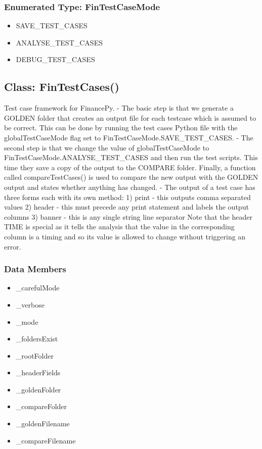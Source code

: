 \documentclass[twoside,11pt]{book}
\begin{document}
\subsubsection{Enumerated Type: FinTestCaseMode}
\begin{itemize}
\item{SAVE\_TEST\_CASES}
\item{ANALYSE\_TEST\_CASES}
\item{DEBUG\_TEST\_CASES}
\end{itemize}

\subsection*{Class: FinTestCases()}
Test case framework for FinancePy. - The basic step is that we generate a GOLDEN folder that creates an output file for each testcase which is assumed to be correct. This can be done by running the test cases Python file with the globalTestCaseMode flag set to FinTestCaseMode.SAVE\_TEST\_CASES. - The second step is that we change the value of globalTestCaseMode to FinTestCaseMode.ANALYSE\_TEST\_CASES and then run the test scripts. This time they save a copy of the output to the COMPARE folder. Finally, a function called compareTestCases() is used to compare the new output with the GOLDEN output and states whether anything has changed.  - The output of a test case has three forms each with its own method:  1) print - this outputs comma separated values 2) header - this must precede any print statement and labels the output columns 3) banner - this is any single string line separator  Note that the header TIME is special as it tells the analysis that the value in the corresponding column is a timing and so its value is allowed to change without triggering an error. 

\subsubsection*{Data Members}
\begin{itemize}
\item{\_carefulMode}
\item{\_verbose}
\item{\_mode}
\item{\_foldersExist}
\item{\_rootFolder}
\item{\_headerFields}
\item{\_goldenFolder}
\item{\_compareFolder}
\item{\_goldenFilename}
\item{\_compareFilename}
\end{itemize}
\end{document}
